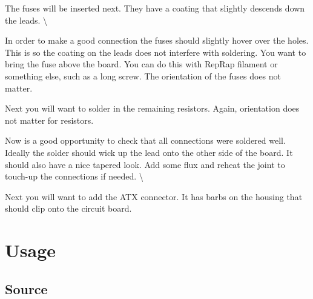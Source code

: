The fuses will be inserted next. They have a coating that slightly
descends down the leads. \textbackslash{}

In order to make a good connection the fuses should slightly hover over
the holes. This is so the coating on the leads does not interfere with
soldering. You want to bring the fuse above the board. You can do this
with RepRap filament or something else, such as a long screw. The
orientation of the fuses does not matter.

Next you will want to solder in the remaining resistors. Again,
orientation does not matter for resistors.

Now is a good opportunity to check that all connections were soldered
well. Ideally the solder should wick up the lead onto the other side of
the board. It should also have a nice tapered look. Add some flux and
reheat the joint to touch-up the connections if needed. \textbackslash{}

Next you will want to add the ATX connector. It has barbs on the housing
that should clip onto the circuit board.

\section{Usage}

\subsection{Source}

